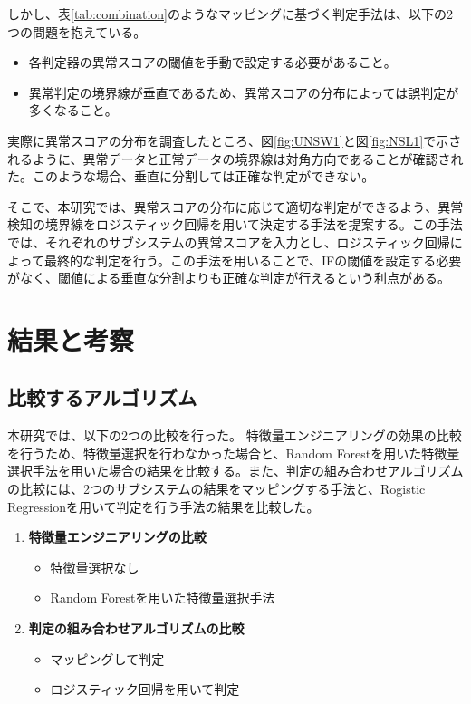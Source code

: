\documentclass{css}
\begin{document}
しかし、表\ref{tab:combination}のようなマッピングに基づく判定手法は、以下の2つの問題を抱えている。
\begin{itemize}
\item 各判定器の異常スコアの閾値を手動で設定する必要があること。
\item 異常判定の境界線が垂直であるため、異常スコアの分布によっては誤判定が多くなること。
\end{itemize}
実際に異常スコアの分布を調査したところ、図\ref{fig:UNSW1}と図\ref{fig:NSL1}で示されるように、異常データと正常データの境界線は対角方向であることが確認された。このような場合、垂直に分割しては正確な判定ができない。

そこで、本研究では、異常スコアの分布に応じて適切な判定ができるよう、異常検知の境界線をロジスティック回帰を用いて決定する手法を提案する。この手法では、それぞれのサブシステムの異常スコアを入力とし、ロジスティック回帰によって最終的な判定を行う。この手法を用いることで、IFの閾値を設定する必要がなく、閾値による垂直な分割よりも正確な判定が行えるという利点がある。

\section{結果と考察}

\subsection{比較するアルゴリズム}

本研究では、以下の2つの比較を行った。
特徴量エンジニアリングの効果の比較を行うため、特徴量選択を行わなかった場合と、Random Forestを用いた特徴量選択手法を用いた場合の結果を比較する。また、判定の組み合わせアルゴリズムの比較には、2つのサブシステムの結果をマッピングする手法と、Rogistic Regressionを用いて判定を行う手法の結果を比較した。

\begin{enumerate}
    \item \textbf{特徴量エンジニアリングの比較}
        \begin{itemize}
            \item 特徴量選択なし
            \item Random Forestを用いた特徴量選択手法
        \end{itemize}
    \item \textbf{判定の組み合わせアルゴリズムの比較}
        \begin{itemize}
            \item マッピングして判定
            \item ロジスティック回帰を用いて判定
        \end{itemize}
\end{enumerate}
\end{document}
